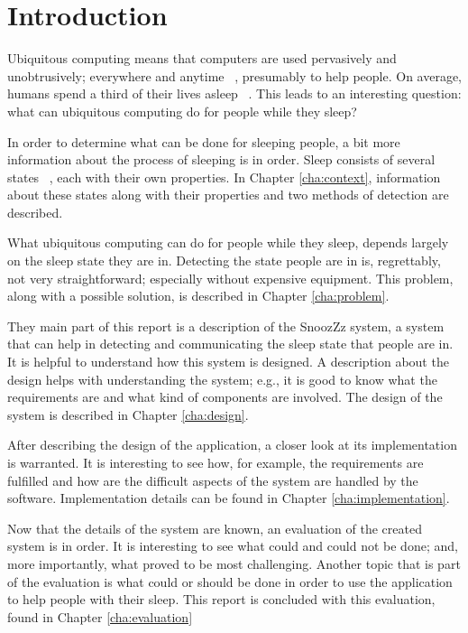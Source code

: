 \chapter{Introduction} %
\label{cha:introduction}
Ubiquitous computing means that computers are used pervasively and unobtrusively; everywhere and anytime ~\cite{Weiser:1993:UC:618984.619973}, presumably to help people. On average, humans spend a third of their lives asleep ~\cite{Lauderdale:2006:Am-J-Epidemiol:16740591}. This leads to an interesting question: what can ubiquitous computing do for people while they sleep? 

In order to determine what can be done for sleeping people, a bit more information about the process of sleeping is in order. Sleep consists of several states ~\cite{Silber:2007fk}, each with their own properties. In Chapter \ref{cha:context}, information about these states along with their properties and two methods of detection are described.

What ubiquitous computing can do for people while they sleep, depends largely on the sleep state they are in. Detecting the state people are in is, regrettably, not very straightforward; especially without expensive equipment. This problem, along with a possible solution, is described in Chapter \ref{cha:problem}.

They main part of this report is a description of the SnoozZz system, a system that can help in detecting and communicating the sleep state that people are in. It is helpful to understand how this system is designed. A description about the design helps with understanding the system; e.g., it is good to know what the requirements are and what kind of components are involved. The design of the system is described in Chapter \ref{cha:design}.

After describing the design of the application, a closer look at its implementation is warranted. It is interesting to see how, for example, the requirements are fulfilled and how are the difficult aspects of the system are handled by the software. Implementation details can be found in Chapter \ref{cha:implementation}.

Now that the details of the system are known, an evaluation of the created system is in order. It is interesting to see what could and could not be done; and, more importantly, what proved to be most challenging. Another topic that is part of the evaluation is what could or should be done in order to use the application to help people with their sleep. This report is concluded with this evaluation, found in Chapter \ref{cha:evaluation}
